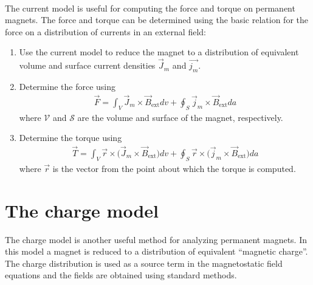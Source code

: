 \documentclass[12pt,a4paper,oneside]{book}
\begin{document}
\begin{onehalfspace}
\begin{example}
\begin{equation}
\begin{aligned}
	\end{aligned}
\end{equation}
\end{example}
The current model is useful for computing the force and torque on permanent magnets. The force and torque can be determined using the basic relation for the force on a distribution of currents in an external field:
\begin{enumerate}
	\item Use the current model to reduce the magnet to a distribution of equivalent volume and surface current densities $\vec{J}_m$ and $\vec{j_m}$.
	\item Determine the force using
\begin{equation}\label{current_model_11}
\boxed{	\begin{aligned}
		\vec{F} = \int_{V} \vec{J}_m\times\vec{B}_{\text{ext}}dv+\oint_{S}\vec{j}_m\times\vec{B}_{\text{ext}}da
	\end{aligned}}
\end{equation}
where $\mathcal{V}$ and $\mathcal{S}$ are the volume and surface of the magnet, respectively.
\item Determine the torque using
 \begin{equation}\label{current_model_12}
 	\boxed{	\begin{aligned}
 			\vec{T} = \int_{V} \vec{r}\times\Big(\vec{J}_m\times\vec{B}_{\text{ext}}\Big)dv+\oint_{S}\vec{r}\times\Big(\vec{j}_m\times\vec{B}_{\text{ext}}\Big)da
 	\end{aligned}}
 \end{equation}
where $\vec{r}$ is the vector from the point about which the torque is computed.
\end{enumerate}
\section{The charge model}
The charge model is another useful method for analyzing permanent magnets. In this model a magnet is reduced to a distribution of equivalent “magnetic charge”. The charge distribution is used as a source term in the magnetostatic field equations and the fields are obtained using standard methods.


\end{onehalfspace}
\end{document}
